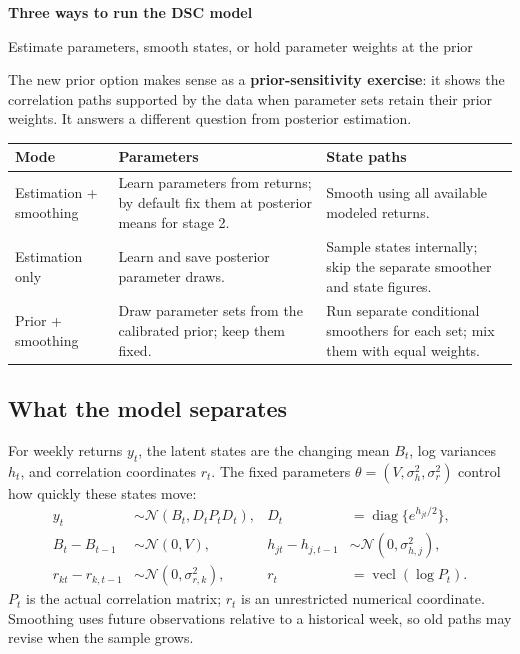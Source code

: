 \documentclass[10pt,a4paper]{article}
\newcommand{\Normal}{\mathcal N}
\begin{document}
{\color{ink}\LARGE\bfseries Three ways to run the DSC model\par}
{\large Estimate parameters, smooth states, or hold parameter weights at the prior\par}
\medskip
The new prior option makes sense as a \textbf{prior-sensitivity exercise}: it shows
the correlation paths supported by the data when parameter sets retain their
prior weights. It answers a different question from posterior estimation.

\begin{tabularx}{\linewidth}{@{}>{\raggedright\arraybackslash}p{32mm}YY@{}}\toprule
Mode & Parameters & State paths \\\midrule
Estimation + smoothing & Learn parameters from returns; by default fix them at posterior means for stage 2. & Smooth using all available modeled returns. \\
Estimation only & Learn and save posterior parameter draws. & Sample states internally; skip the separate smoother and state figures. \\
Prior + smoothing & Draw parameter sets from the calibrated prior; keep them fixed. & Run separate conditional smoothers for each set; mix them with equal weights. \\\bottomrule
\end{tabularx}

\subsection*{What the model separates}
For weekly returns $y_t$, the latent states are the changing mean $B_t$,
log variances $h_t$, and correlation coordinates $r_t$. The fixed parameters
$\theta=(V,\sigma_h^2,\sigma_r^2)$ control how quickly these states move:
\begin{align*}
y_t &\sim\Normal(B_t,D_tP_tD_t), &D_t&=\operatorname{diag}\{e^{h_{jt}/2}\},\\
B_t-B_{t-1}&\sim\Normal(0,V), &
h_{jt}-h_{j,t-1}&\sim\Normal(0,\sigma_{h,j}^2),\\
r_{kt}-r_{k,t-1}&\sim\Normal(0,\sigma_{r,k}^2), &
r_t&=\operatorname{vecl}(\log P_t).
\end{align*}
$P_t$ is the actual correlation matrix; $r_t$ is an unrestricted numerical
coordinate. Smoothing uses future observations relative to a historical week,
so old paths may revise when the sample grows.
\end{document}
